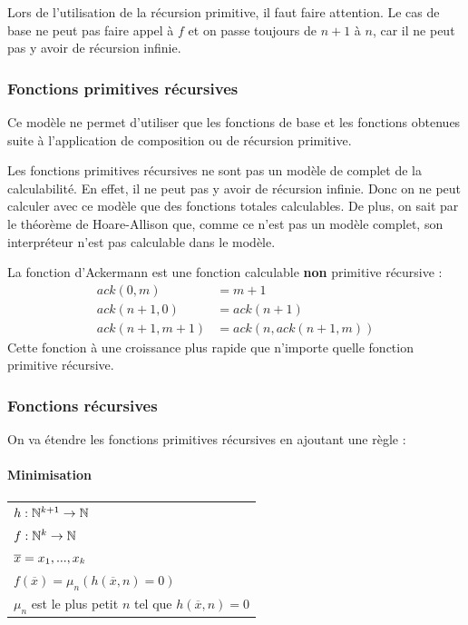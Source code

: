 \begin{myrem}
	Lors de l'utilisation de la récursion primitive, il faut faire 
	attention. Le cas de base ne peut pas faire appel à $f$ et on passe 
	toujours de $n+1$ à $n$, car il ne peut pas y avoir de récursion infinie.
\end{myrem}

\subsubsection{Fonctions primitives récursives}
Ce modèle ne permet d'utiliser que les fonctions de base et les fonctions 
obtenues suite à l'application de composition ou de récursion primitive.

\begin{myprop}
	Les fonctions primitives récursives ne sont pas un modèle de complet de 
	la calculabilité. En effet, il ne peut pas y avoir de récursion 
	infinie. Donc on ne peut calculer avec ce modèle que des fonctions 
	totales calculables. De plus, on sait par le théorème de Hoare-Allison que, comme ce 
	n'est pas un modèle complet, son interpréteur n'est pas calculable 
	dans le modèle.
\end{myprop}

\begin{myexem}
	La fonction d'Ackermann est une fonction calculable \textbf{non} 
	primitive récursive :
	\begin{align}
		ack(0,m) &= m+1 \\
		ack(n+1,0) &= ack(n+1)\\
		ack(n+1,m+1) &= ack(n, ack(n+1,m))
	\end{align}
	Cette fonction à une croissance plus rapide que n'importe quelle fonction 
	primitive récursive.
\end{myexem}


\subsubsection{Fonctions récursives}
\label{ssub:fonctions_r_cursives}
On va étendre les fonctions primitives récursives en ajoutant une règle :

\paragraph{Minimisation}
\begin{tabular}{|l|}
	\hline
	$h: \mathbb{N}^{k+1} \rightarrow \mathbb{N}$\\
	$f: \mathbb{N}^{k} \rightarrow \mathbb{N}$\\
	$\overline{x} =x_1,...,x_k$ \\
	$f(\overline{x}) = \mu_n (h(\overline{x}, n) = 0)$\\
	$\mu_n$ est le plus petit $n$ tel que $h(\overline{x}, n) = 0$ \\
	\hline
\end{tabular}

